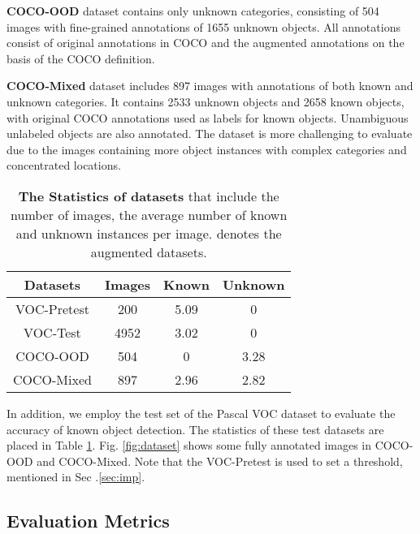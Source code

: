 \documentclass[10pt,twocolumn,letterpaper]{article}
\newcommand{\xf}[1]{{\color{black} #1}}
\begin{document}
\noindent\textbf{COCO-OOD} dataset \xf{contains only} unknown categories,
consisting of 504 images with ﬁne-grained annotations of 1655 unknown objects.
All annotations consist of original annotations in COCO and the augmented annotations on the basis of the COCO definition.



\noindent\textbf{COCO-Mixed} dataset includes 897 images with annotations of both known and unknown categories. 
It contains 2533 unknown objects and 2658 known objects, with original COCO annotations used as labels for known objects. 
Unambiguous unlabeled objects are also annotated. 
The dataset is more challenging to evaluate due to the images containing more object instances with complex categories and concentrated locations.


\begin{table}[t!]
\centering
\begin{tabular}{c|c|c c}
\toprule
Datasets               & Images & Known        & Unknown\\ \midrule
VOC-Pretest            & 200    & 5.09         & 0      \\
VOC-Test               & 4952   & 3.02         & 0      \\
COCO-OOD   & 504    & 0            & 3.28   \\ 
COCO-Mixed & 897    & 2.96         & 2.82   \\\bottomrule
\end{tabular}
\caption{\textbf{The Statistics of datasets} \xf{that include} the number of images, the average number of known and unknown instances per image.
 denotes the augmented datasets.}
\vspace{-7pt}
\label{tab:datasets}
\end{table}



In addition, we employ the test set of the Pascal VOC dataset to evaluate the accuracy of known object detection.
The statistics of these test datasets are placed in Table \ref{tab:datasets}. Fig. \ref{fig:dataset} shows some fully annotated images in COCO-OOD and COCO-Mixed.
Note that the VOC-Pretest is used to set a threshold,
mentioned in Sec .\ref{sec:imp}.

\subsection{Evaluation Metrics}
\end{document}
